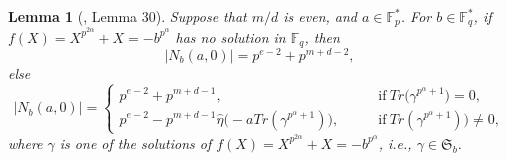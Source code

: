\documentclass[final,1p,times]{elsarticle}
\newtheorem{sec3_lemma12_a0}[sec3_lemma1x]{Lemma}
\begin{document}
        
   \begin{sec3_lemma12_a0}[\cite{Bib7}, Lemma 30]\label{Na0_md_even}
             Suppose that $ m/d $ is even, and $ a\in \mathbb{F}_{p}^{*}$.  For $ b\in \mathbb{F}_{q}^{*}  $, if 
             $  f(X)=X^{p^{2\alpha}} +X=- b^{p^{\alpha}} $ has no solution in $ \mathbb{F}_{q} $, then 
             \begin{equation*}
             |N_{b}(a,0)|=p^{e-2}+p^{m+d-2},
             \end{equation*}
             else
             \begin{equation*}
             |N_{b}(a,0)|=
             \begin{cases}
             p^{e-2}+p^{m+d-1},&\qquad\text{if}\ Tr\bigl(\gamma^{p^{\alpha}+1}\bigr)=0,\\
             p^{e-2}-p^{m+d-1}\widehat{\eta}\bigl(-aTr(\gamma^{p^{\alpha}+1})\bigr),&\qquad\text{if}\ Tr(\gamma^{p^{\alpha}+1}))\ne 0,
             \end{cases}
             \end{equation*}
             where $ \gamma $ is one of the  solutions of $ f(X)=X^{p^{2\alpha}} +X=- b^{p^{\alpha}} $, i.e., $ \gamma\in \mathfrak{S}_{b} $.
             \end{sec3_lemma12_a0}
  
\end{document}
